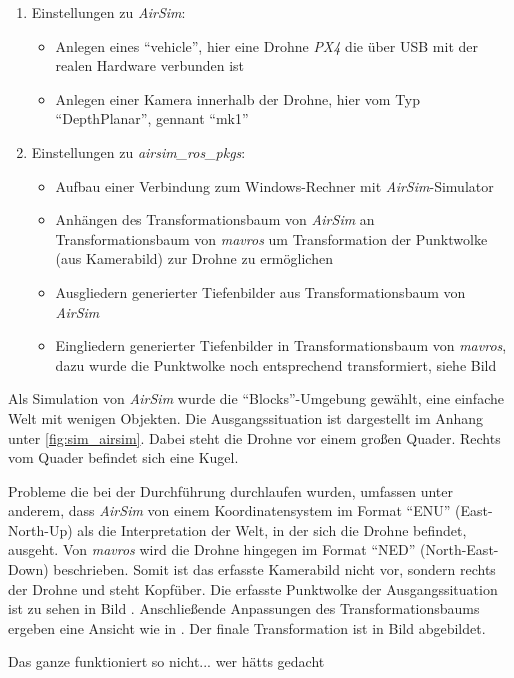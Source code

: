 \begin{enumerate}
\begin{itemize}
    \end{itemize}
    \item Einstellungen zu \textit{AirSim}:
    \begin{itemize}
        \item Anlegen eines \enquote{vehicle}, hier eine Drohne \textit{PX4} die über USB mit der realen Hardware verbunden ist
        \item Anlegen einer Kamera innerhalb der Drohne, hier vom Typ \enquote{DepthPlanar}, gennant \enquote{mk1}
    \end{itemize}
    \item Einstellungen zu \textit{airsim\_ros\_pkgs}:
    \begin{itemize}
        \item Aufbau einer Verbindung zum Windows-Rechner mit \textit{AirSim}-Simulator
        \item Anhängen des Transformationsbaum von \textit{AirSim} an Transformationsbaum von \textit{mavros} um Transformation der Punktwolke (aus Kamerabild) zur Drohne zu ermöglichen  
        \item Ausgliedern generierter Tiefenbilder aus Transformationsbaum von \textit{AirSim}
        \item Eingliedern generierter Tiefenbilder in Transformationsbaum von \textit{mavros}, dazu wurde die Punktwolke noch entsprechend transformiert, siehe Bild 
    \end{itemize} 
\end{enumerate}

Als Simulation von \textit{AirSim} wurde die \enquote{Blocks}-Umgebung gewählt, eine einfache Welt mit wenigen Objekten. Die Ausgangssituation ist dargestellt im Anhang unter \ref{fig:sim_airsim}. Dabei steht die Drohne vor einem großen Quader. Rechts vom Quader befindet sich eine Kugel.

Probleme die bei der Durchführung durchlaufen wurden, umfassen unter anderem, dass \textit{AirSim} von einem Koordinatensystem im Format \enquote{ENU} (East-North-Up) als die Interpretation der Welt, in der sich die Drohne befindet, ausgeht. Von \textit{mavros} wird die Drohne hingegen im Format \enquote{NED} (North-East-Down) beschrieben. Somit ist das erfasste Kamerabild nicht vor, sondern rechts der Drohne und steht Kopfüber. Die erfasste Punktwolke der Ausgangssituation ist zu sehen in Bild . Anschließende Anpassungen des Transformationsbaums ergeben eine Ansicht wie in . Der finale Transformation ist in Bild  abgebildet.

Das ganze funktioniert so nicht... wer hätts gedacht

\clearpage